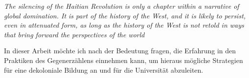 \documentclass[11pt]{article}
\newenvironment{myenv}{\begin{adjustwidth}{2cm}{}}{\end{adjustwidth}}
\begin{document}
\begin{myenv}

  \textit{ \glqq The silencing of the Haitian Revolution is only a chapter within
    a narrative of global domination. It is part of the history of the West, and
    it is likely to persist, even in attenuated form, as long as the history of
    the West is not retold in ways that bring forward the perspectives of the
world \grqq \footnotemark {} } \end{myenv}

In dieser Arbeit möchte ich nach der Bedeutung fragen, die Erfahrung in den
Praktiken des Gegenerzählens einnehmen kann, um hieraus mögliche Strategien
für eine dekoloniale Bildung an und für die Universität abzuleiten.
\end{document}
